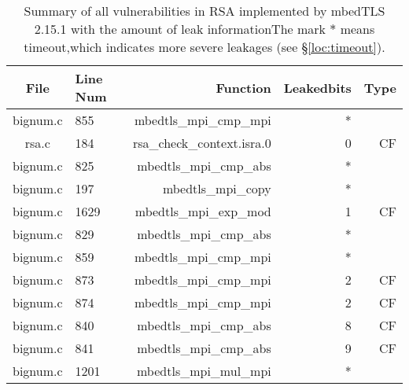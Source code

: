 \begin{table}%
\centering
\caption{Summary of all vulnerabilities in RSA implemented by mbedTLS 2.15.1 with the amount of leak informationThe mark $*$ means timeout,which indicates more severe leakages (see \S\ref{loc:timeout}).}\label{tab:RSAmbedTLS}
\begin{tabular}{clrrr}
\hline
\textbf{File} & \textbf{Line Num} & \textbf{Function} & \textbf{Leakedbits} & \textbf{Type} \\\hline
bignum.c& 855&mbedtls\_mpi\_cmp\_mpi&*&\\
rsa.c& 184&rsa\_check\_context.isra.0&0 &CF\\
bignum.c& 825&mbedtls\_mpi\_cmp\_abs&*&\\
bignum.c& 197&mbedtls\_mpi\_copy&*&\\
bignum.c& 1629&mbedtls\_mpi\_exp\_mod&1 &CF\\
bignum.c& 829&mbedtls\_mpi\_cmp\_abs&*&\\
bignum.c& 859&mbedtls\_mpi\_cmp\_mpi&*&\\
bignum.c& 873&mbedtls\_mpi\_cmp\_mpi&2 &CF\\
bignum.c& 874&mbedtls\_mpi\_cmp\_mpi&2 &CF\\
bignum.c& 840&mbedtls\_mpi\_cmp\_abs&8 &CF\\
bignum.c& 841&mbedtls\_mpi\_cmp\_abs&9 &CF\\
bignum.c& 1201&mbedtls\_mpi\_mul\_mpi&*&\\
\hline
\end{tabular}
\end{table}